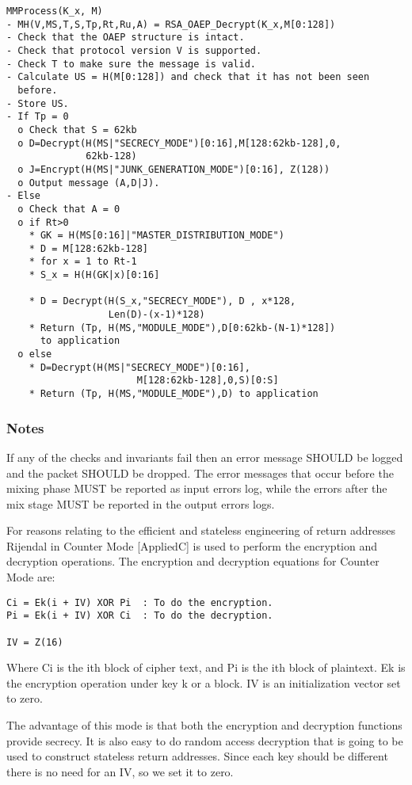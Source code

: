 \documentclass{article}
\begin{document}
\begin{verbatim}
MMProcess(K_x, M)
- MH(V,MS,T,S,Tp,Rt,Ru,A) = RSA_OAEP_Decrypt(K_x,M[0:128])
- Check that the OAEP structure is intact.
- Check that protocol version V is supported.
- Check T to make sure the message is valid.
- Calculate US = H(M[0:128]) and check that it has not been seen
  before.
- Store US.
- If Tp = 0
  o Check that S = 62kb
  o D=Decrypt(H(MS|"SECRECY_MODE")[0:16],M[128:62kb-128],0,
              62kb-128)
  o J=Encrypt(H(MS|"JUNK_GENERATION_MODE")[0:16], Z(128))
  o Output message (A,D|J).
- Else
  o Check that A = 0
  o if Rt>0 
    * GK = H(MS[0:16]|"MASTER_DISTRIBUTION_MODE")
    * D = M[128:62kb-128]
    * for x = 1 to Rt-1
    * S_x = H(H(GK|x)[0:16]

    * D = Decrypt(H(S_x,"SECRECY_MODE"), D , x*128, 
                  Len(D)-(x-1)*128)
    * Return (Tp, H(MS,"MODULE_MODE"),D[0:62kb-(N-1)*128]) 
      to application
  o else
    * D=Decrypt(H(MS|"SECRECY_MODE")[0:16],
                       M[128:62kb-128],0,S)[0:S]
    * Return (Tp, H(MS,"MODULE_MODE"),D) to application
\end{verbatim}

\subsubsection{Notes}

If any of the checks and invariants fail then an error message SHOULD
be logged and the packet SHOULD be dropped. The error messages that
occur before the mixing phase MUST be reported as input errors log,
while the errors after the mix stage MUST be reported in the output
errors logs.

For reasons relating to the efficient and stateless engineering of return 
addresses Rijendal in Counter Mode [AppliedC] is used to perform the 
encryption and decryption operations. The encryption and decryption
equations for Counter Mode are:

\begin{verbatim}
Ci = Ek(i + IV) XOR Pi  : To do the encryption.
Pi = Ek(i + IV) XOR Ci  : To do the decryption.

IV = Z(16)
\end{verbatim}

Where Ci is the ith block of cipher text, and Pi is the ith block of
plaintext. Ek is the encryption operation under key k or a block. IV
is an initialization vector set to zero.

The advantage of this mode is that both the encryption and decryption
functions provide secrecy. It is also easy to do random access
decryption that is going to be used to construct stateless return
addresses. Since each key should be different there is no need for an
IV, so we set it to zero. 
\end{document}
